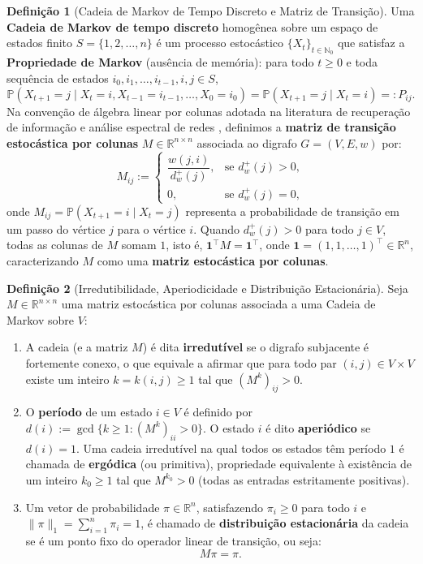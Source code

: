 \documentclass[10pt,a4paper]{article}
\theoremstyle{definition}
\newtheorem{definicao}{Definição}[section]
\theoremstyle{plain}
\theoremstyle{remark}
\begin{document}
\begin{definicao}[Cadeia de Markov de Tempo Discreto e Matriz de Transição]
Uma \textbf{Cadeia de Markov de tempo discreto} homogênea sobre um espaço de estados finito $S = \{1, 2, \dots, n\}$ é um processo estocástico $\{X_t\}_{t \in \mathbb{N}_0}$ que satisfaz a \textbf{Propriedade de Markov} (ausência de memória): para todo $t \ge 0$ e toda sequência de estados $i_0, i_1, \dots, i_{t-1}, i, j \in S$,
\[
\mathbb{P}(X_{t+1} = j \mid X_t = i, X_{t-1} = i_{t-1}, \dots, X_0 = i_0) = \mathbb{P}(X_{t+1} = j \mid X_t = i) =: P_{ij}.
\]
Na convenção de álgebra linear por colunas adotada na literatura de recuperação de informação e análise espectral de redes \cite{brin1998, langville2006}, definimos a \textbf{matriz de transição estocástica por colunas} $M \in \mathbb{R}^{n \times n}$ associada ao digrafo $G = (V, E, w)$ por:
\[
M_{ij} := \begin{cases}
\dfrac{w(j, i)}{d^{+}_{w}(j)}, & \text{se } d^{+}_{w}(j) > 0, \\[0.25cm]
0, & \text{se } d^{+}_{w}(j) = 0,
\end{cases}
\]
onde $M_{ij} = \mathbb{P}(X_{t+1} = i \mid X_t = j)$ representa a probabilidade de transição em um passo do vértice $j$ para o vértice $i$. Quando $d^{+}_{w}(j) > 0$ para todo $j \in V$, todas as colunas de $M$ somam $1$, isto é, $\mathbf{1}^{\top} M = \mathbf{1}^{\top}$, onde $\mathbf{1} = (1, 1, \dots, 1)^{\top} \in \mathbb{R}^n$, caracterizando $M$ como uma \textbf{matriz estocástica por colunas}.
\end{definicao}

\begin{definicao}[Irredutibilidade, Aperiodicidade e Distribuição Estacionária]
Seja $M \in \mathbb{R}^{n \times n}$ uma matriz estocástica por colunas associada a uma Cadeia de Markov sobre $V$:
\begin{enumerate}
    \item A cadeia (e a matriz $M$) é dita \textbf{irredutível} se o digrafo subjacente é fortemente conexo, o que equivale a afirmar que para todo par $(i, j) \in V \times V$ existe um inteiro $k = k(i, j) \ge 1$ tal que $(M^k)_{ij} > 0$.
    \item O \textbf{período} de um estado $i \in V$ é definido por $d(i) := \gcd\{k \ge 1 : (M^k)_{ii} > 0\}$. O estado $i$ é dito \textbf{aperiódico} se $d(i) = 1$. Uma cadeia irredutível na qual todos os estados têm período $1$ é chamada de \textbf{ergódica} (ou primitiva), propriedade equivalente à existência de um inteiro $k_0 \ge 1$ tal que $M^{k_0} > 0$ (todas as entradas estritamente positivas).
    \item Um vetor de probabilidade $\pi \in \mathbb{R}^n$, satisfazendo $\pi_i \ge 0$ para todo $i$ e $\|\pi\|_1 = \sum_{i=1}^{n} \pi_i = 1$, é chamado de \textbf{distribuição estacionária} da cadeia se é um ponto fixo do operador linear de transição, ou seja:
    \[
    M \pi = \pi.
    \]
\end{enumerate}
\end{definicao}
\end{document}
